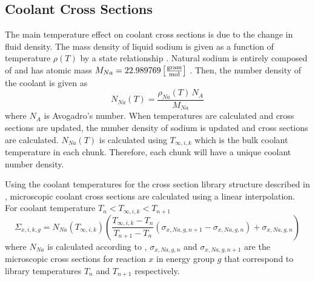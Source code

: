   \subsection{Coolant Cross Sections}
    The main temperature effect on coolant cross sections is due to the
    change in fluid density. The mass density of liquid sodium 
    is given as a function of temperature $\rho(T)$ by a state relationship 
    \cite{sodiumProp}. Natural sodium is entirely composed of  
    and has atomic mass ${M_{Na} = 22.989769
    \left[\text{{$\frac{\text{gram}}{\text{mol}}$}}\right]}$ \cite{nuclides}.
    Then, the number density of the coolant is given as
    \begin{equation}
      \label{eq:number_density_sodium}
      N_{Na}(T) = \frac{\rho_{Na}(T) \, N_A}{M_{Na}}
    \end{equation}
    where $N_A$ is Avogadro's number. When temperatures are calculated and
    cross sections are updated, the number density of sodium is updated and
    cross sections are calculated. $N_{Na}(T)$ is calculated using
    $T_{\infty,i,k}$ which is the bulk coolant temperature in each chunk.
    Therefore, each chunk will have a unique coolant number density.
    

    Using the coolant temperatures for the cross section library structure
    described in , microscopic coolant cross 
    sections are calculated using a linear interpolation. For coolant
    temperature ${T_{n}<T_{\infty,i,k}<T_{n+1}}$ 
    \begin{equation}
      \label{eq:xs_cool}
      \Sigma_{x,i,k,g} = N_{Na}(T_{\infty,i,k}) 
        \left( \frac{T_{\infty,i,k} - T_{n}}{T_{n+1}-T_{n}} 
        (\sigma_{x,Na,g,n+1} - \sigma_{x,Na,g,n})  + \sigma_{x,Na,g,n}\right)
    \end{equation}
    where $N_{Na}$ is calculated according to ,
    $\sigma_{x,Na,g,n}$ and $\sigma_{x,Na,g,n+1}$ are the microscopic 
    cross sections for reaction $x$ in energy group $g$ that correspond to 
    library temperatures $T_n$ and $T_{n+1}$ respectively.

